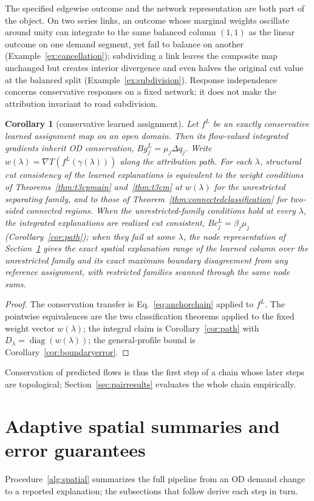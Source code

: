 \documentclass[a4paper,fleqn]{cas-sc}
\newtheorem{corollary}[theorem]{Corollary}
\begin{document}
The specified edgewise outcome and the network representation are both
part of the object. On two series links, an outcome whose marginal
weights oscillate around unity can integrate to the same balanced column
$(1,1)$ as the linear outcome on one demand segment, yet fail to balance
on another (Example~\ref{ex:cancellation}); subdividing a link leaves
the composite map unchanged but creates interior divergence and even
halves the original cut value at the balanced split
(Example~\ref{ex:subdivision}). Response independence concerns
conservative responses on a fixed network; it does not make the attribution
invariant to road subdivision.

\begin{corollary}[conservative learned assignment]\label{cor:learned}
Let $f^L$ be an exactly conservative learned assignment map on an open
domain. Then its flow-valued integrated gradients inherit OD
conservation, $Bg^L_j=\mu_j\Delta q_j$. Write
$w(\lambda)=\nabla T(f^L(\gamma(\lambda)))$ along the attribution path.
For each $\lambda$, structural cut consistency of the learned
explanations is equivalent to the weight conditions of
Theorems~\ref{thm:t3cpmain} and~\ref{thm:t3cm} at $w(\lambda)$ for the
unrestricted separating family, and to those of
Theorem~\ref{thm:connectedclassification} for two-sided connected
regions. When the unrestricted-family conditions hold at every
$\lambda$, the integrated explanations are realized cut consistent,
$Bc^{L}_j=\beta_j\mu_j$
(Corollary~\ref{cor:path}); when they fail at some $\lambda$, the node
representation of Section~\ref{sec:stability} gives the exact spatial
explanation range of the learned column over the unrestricted family
and its exact maximum boundary disagreement from any reference
assignment, with restricted families scanned through the same node
sums.
\end{corollary}
\begin{proof}
The conservation transfer is Eq.~\eqref{eq:anchorchain} applied to
$f^L$. The pointwise equivalences are the two classification theorems
applied to the fixed weight vector $w(\lambda)$; the integral claim is
Corollary~\ref{cor:path} with
$D_\lambda=\operatorname{diag}(w(\lambda))$; the general-profile bound is
Corollary~\ref{cor:boundaryerror}.
\end{proof}
Conservation of predicted flows is thus the first step of a chain whose
later steps are topological; Section~\ref{sec:pairresults} evaluates the
whole chain empirically.

\FloatBarrier
\section{Adaptive spatial summaries and error guarantees}\label{sec:stability}\label{sec:algorithm}
Procedure~\ref{alg:spatial} summarizes the full pipeline from an OD
demand change to a reported explanation; the subsections that follow
derive each step in turn.
\end{document}
